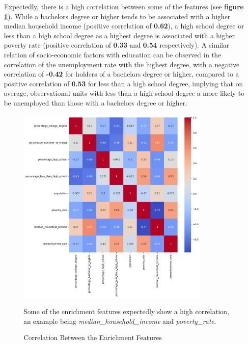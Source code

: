 Expectedly, there is a high correlation between some of the features (see \textbf{figure \ref{fig:CH03_Enrichment_Correlation}}).
While a bachelors degree or higher tends to be associated with a higher median household income (positive correlation of \textbf{0.62}), a high school degree or less than a high school degree as a highest degree is associated with a higher poverty rate (positive correlation of \textbf{0.33} and \textbf{0.54} respectively).
A similar relation of socio-economic factors with education can be observed in the correlation of the unemployment rate with the highest degree, with a negative correlation of \textbf{-0.42} for holders of a bachelors degree or higher, compared to a positive correlation of \textbf{0.53} for less than a high school degree, implying that on average, observational units with less than a high school degree a more likely to be unemployed than those with a bachelors degree or higher.

\begin{figure}[h]
    \centering
    \includegraphics[width=0.85\textwidth]{images/CH03_Enrichment_Correlation.png}
    \caption{Correlation Between the Enrichment Features}
    \medskip
    \small
    Some of the enrichment features expectedly show a high correlation, an example being \textit{median\_household\_income} and \textit{poverty\_rate}.
    \label{fig:CH03_Enrichment_Correlation}
\end{figure}
